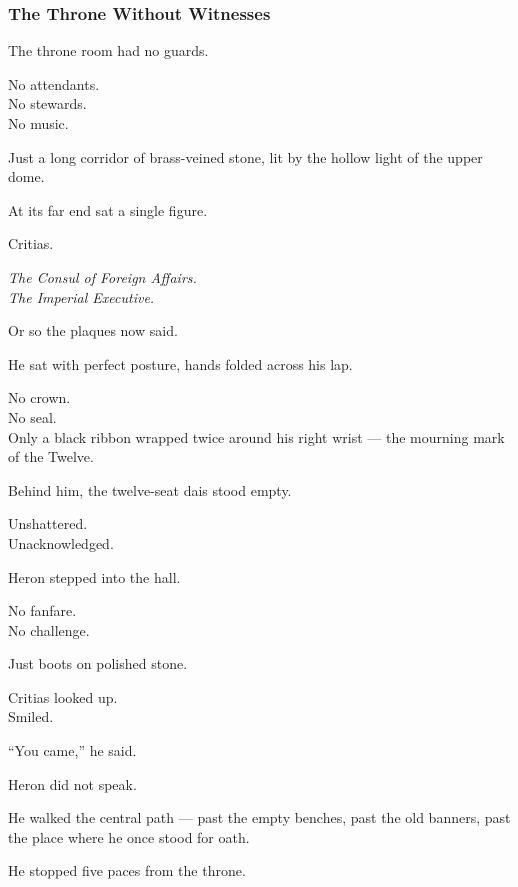 \documentclass[12pt]{article}
\begin{document}
\dotfill

\subsubsection{The Throne Without Witnesses}

The throne room had no guards.

No attendants.\\
No stewards.\\
No music.

Just a long corridor of brass-veined stone, lit by the hollow light of the upper dome.

At its far end sat a single figure.

Critias.

\textit{The Consul of Foreign Affairs.}\\
\textit{The Imperial Executive.}

Or so the plaques now said.

\vspace{1em}

He sat with perfect posture, hands folded across his lap.

No crown.\\
No seal.\\
Only a black ribbon wrapped twice around his right wrist — the mourning mark of the Twelve.

Behind him, the twelve-seat dais stood empty.

Unshattered.\\
Unacknowledged.

\vspace{1em}

Heron stepped into the hall.

No fanfare.\\
No challenge.

Just boots on polished stone.

Critias looked up.\\
Smiled.

“You came,” he said.

\vspace{1em}

Heron did not speak.

He walked the central path — past the empty benches, past the old banners, past the place where he once stood for oath.

He stopped five paces from the throne.

\vspace{1em}
\end{document}
